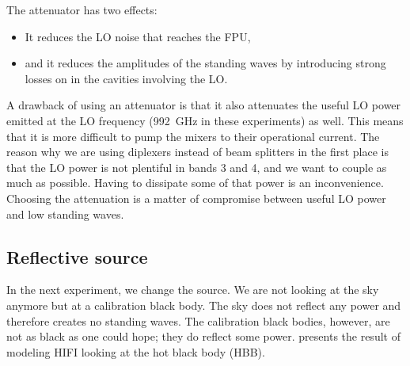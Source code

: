 The attenuator has two effects:
\begin{itemize}
    \item It reduces the LO noise that reaches the FPU,
    \item and it reduces the amplitudes of the standing waves by introducing strong losses on in the cavities involving the LO.
\end{itemize}
A drawback of using an attenuator is that it also attenuates the useful LO power emitted at the LO frequency (\SI{992}{\giga\hertz} in these experiments) as well.
This means that it is more difficult to pump the mixers to their operational current.
The reason why we are using diplexers instead of beam splitters in the first place is that the LO power is not plentiful in bands 3 and 4, and we want to couple as much as possible.
Having to dissipate some of that power is an inconvenience.
Choosing the attenuation is a matter of compromise between useful LO power and low standing waves.

\clearpage
\subsection{Reflective source}
In the next experiment, we change the source.
We are not looking at the sky anymore but at a calibration black body.
The sky does not reflect any power and therefore creates no standing waves.
The calibration black bodies, however, are not as black as one could hope; they do reflect some power.
 presents the result of modeling HIFI looking at the hot black body (HBB).

